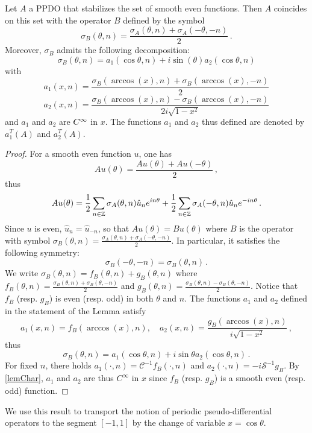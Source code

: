 \documentclass[a4paper]{article}
\begin{document}
\begin{Lem}
	\label{TransportPPDO_T}
	Let $A$ a PPDO that stabilizes the set of smooth even functions. Then $A$ coincides on this set with the operator $B$ defined by the symbol
	\[\sigma_B(\theta,n) = \frac{\sigma_A(\theta,n) + \sigma_A(-\theta,-n)}{2}\,.\]
	Moreover, $\sigma_B$ admits the following decomposition:
	\[ \sigma_B(\theta,n) = a_1(\cos\theta,n) + i \sin(\theta)a_2(\cos\theta,n) \]
	with 
	\[a_1(x,n) = \frac{\sigma_B(\arccos(x),n) + \sigma_B(\arccos(x),-n)}{2}\]
	\[a_2(x,n) = \frac{\sigma_B(\arccos(x),n) - \sigma_B(\arccos(x),-n)}{2i\sqrt{1-x^2}}\] 
	and $a_1$ and $a_2$ are $C^{\infty}$ in $x$. The functions $a_1$ and $a_2$ thus defined are denoted by $a_1^T(A)$ and $a_2^T(A)$. 
\end{Lem}
\begin{proof}
For a smooth even function $u$, one has
\[Au(\theta) = \frac{Au(\theta) + Au(-\theta)}{2}\,,\]
thus
\[Au(\theta) = \frac{1}{2}\sum_{n \in \mathbb{Z}} \sigma_A(\theta,n) \hat{u}_n e^{in\theta} + \frac{1}{2}\sum_{n \in \mathbb{Z}} \sigma_A(-\theta,n)\hat{u}_n e^{-in\theta}\,.\]
Since $u$ is even, $\hat{u}_n = \hat{u}_{-n}$, so that $Au(\theta) = Bu(\theta)$ where $B$ is the operator with symbol $\sigma_B(\theta,n) = \frac{\sigma_A(\theta,n) + \sigma_A(-\theta,-n)}{2}$. In particular, it satisfies the following symmetry:
\[\sigma_B(-\theta,-n) = \sigma_B(\theta,n)\,.\] 
We write $\sigma_B(\theta,n) = f_B(\theta,n) + g_B(\theta,n)$ where $f_B(\theta,n) = \frac{\sigma_B(\theta,n) + \sigma_B(\theta,-n)}{2}$ and $g_B(\theta,n) = \frac{\sigma_B(\theta,n) - \sigma_B(\theta,-n)}{2}$. Notice that $f_B$ (resp. $g_B$) is even (resp. odd) in both $\theta$ and $n$.
The functions $a_1$ and $a_2$ defined in the statement of the Lemma satisfy
\[a_1(x,n) = f_B(\arccos(x),n),\quad a_2(x,n) = \frac{g_B(\arccos(x),n)}{i\sqrt{1-x^2}}\,,\]
thus 
\[\sigma_B(\theta,n) = a_1(\cos\theta,n) + i \sin\theta a_2(\cos\theta,n)\,. \]
For fixed $n$, there holds $a_1(\cdot,n) = \mathcal{C}^{-1}f_B(\cdot,n)$ and $a_2(\cdot,n) = -i\mathcal{S}^{-1}g_B$. By \autoref{lemChar}, $a_1$ and $a_2$ are thus $C^\infty$ in $x$ since $f_B$ (resp. $g_B$) is a smooth even (resp. odd) function.  
\end{proof}
We use this result to transport the notion of periodic pseudo-differential operators to the segment $[-1,1]$ by the change of variable $x = \cos\theta$. 
\end{document}
